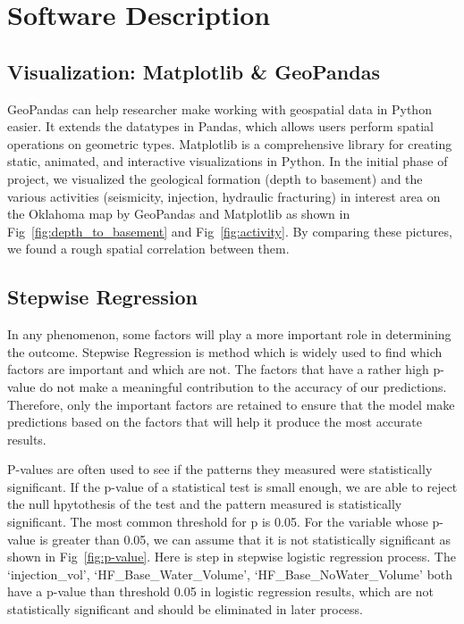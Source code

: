 \documentclass[final-report]{report-template}
\begin{document}
\section{Software Description}
\subsection{Visualization: Matplotlib \& GeoPandas}
GeoPandas can help researcher make working with geospatial data in Python easier. It extends the datatypes in Pandas, which allows users perform spatial operations on geometric types.
Matplotlib is a comprehensive library for creating static, animated, and interactive visualizations in Python.
In the initial phase of project, we visualized the geological formation (depth to basement) and the various activities (seismicity, injection, hydraulic fracturing) in interest area on the Oklahoma map by GeoPandas and Matplotlib as shown in Fig~\ref{fig:depth_to_basement} and Fig~\ref{fig:activity}.
By comparing these pictures, we found a rough spatial correlation between them.
\subsection{Stepwise Regression}
In any phenomenon, some factors will play a more important role in determining the outcome. Stepwise Regression is method which is widely used to find which factors are important and which are not. 
The factors that have a rather high p-value do not make a meaningful contribution to the accuracy of our predictions. 
Therefore, only the important factors are retained to ensure that the model make predictions based on the factors that will help it produce the most accurate results.

P-values are often used to see if the patterns they measured were statistically significant. If the p-value of a statistical test is small enough, we are able to reject the null hpytothesis of the test and the pattern measured is statistically significant.
The most common threshold for p is 0.05. For the variable whose p-value is greater than 0.05, we can assume that it is not statistically significant as shown in Fig~\ref{fig:p-value}. Here is step in stepwise logistic regression process.
The `injection\_vol', `HF\_Base\_Water\_Volume', `HF\_Base\_NoWater\_Volume' both have a p-value than threshold 0.05 in logistic regression results, which are not statistically significant and should be eliminated in later process.
\end{document}
